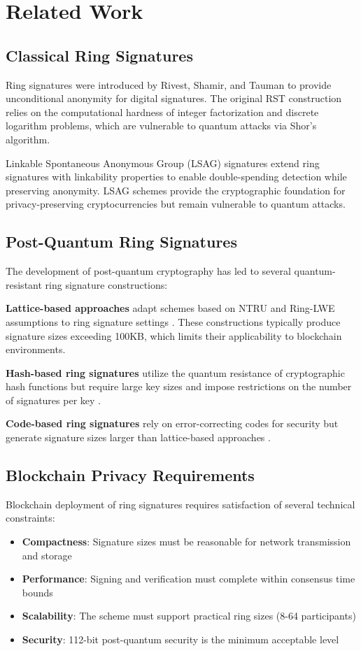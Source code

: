 \documentclass[11pt,a4paper]{article}
\begin{document}
\section{Related Work}

\subsection{Classical Ring Signatures}

Ring signatures were introduced by Rivest, Shamir, and Tauman \cite{rst01} to provide unconditional anonymity for digital signatures. The original RST construction relies on the computational hardness of integer factorization and discrete logarithm problems, which are vulnerable to quantum attacks via Shor's algorithm.

Linkable Spontaneous Anonymous Group (LSAG) signatures \cite{lsag04} extend ring signatures with linkability properties to enable double-spending detection while preserving anonymity. LSAG schemes provide the cryptographic foundation for privacy-preserving cryptocurrencies but remain vulnerable to quantum attacks.

\subsection{Post-Quantum Ring Signatures}

The development of post-quantum cryptography has led to several quantum-resistant ring signature constructions:

\textbf{Lattice-based approaches} adapt schemes based on NTRU and Ring-LWE assumptions to ring signature settings \cite{lattice-rings}. These constructions typically produce signature sizes exceeding 100KB, which limits their applicability to blockchain environments.

\textbf{Hash-based ring signatures} utilize the quantum resistance of cryptographic hash functions but require large key sizes and impose restrictions on the number of signatures per key \cite{hash-rings}.

\textbf{Code-based ring signatures} rely on error-correcting codes for security but generate signature sizes larger than lattice-based approaches \cite{code-rings}.

\subsection{Blockchain Privacy Requirements}

Blockchain deployment of ring signatures requires satisfaction of several technical constraints:
\begin{itemize}
\item \textbf{Compactness}: Signature sizes must be reasonable for network transmission and storage
\item \textbf{Performance}: Signing and verification must complete within consensus time bounds
\item \textbf{Scalability}: The scheme must support practical ring sizes (8-64 participants)
\item \textbf{Security}: 112-bit post-quantum security is the minimum acceptable level
\end{itemize}
\end{document}
